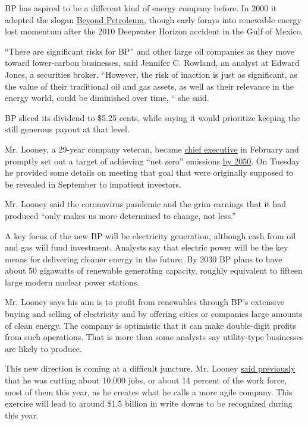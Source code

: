 BP has aspired to be a different kind of energy company before. In 2000
it adopted the slogan
\href{https://www.nytimes.com/2002/12/08/magazine/how-green-is-bp.html}{Beyond
Petroleum}, though early forays into renewable energy lost momentum
after the 2010 Deepwater Horizon accident in the Gulf of Mexico.

``There are significant risks for BP'' and other large oil companies as
they move toward lower-carbon businesses, said Jennifer C. Rowland, an
analyst at Edward Jones, a securities broker. ``However, the risk of
inaction is just as significant, as the value of their traditional oil
and gas assets, as well as their relevance in the energy world, could be
diminished over time, `` she said.

BP sliced its dividend to \$5.25 cents, while saying it would prioritize
keeping the still generous payout at that level.

Mr. Looney, a 29-year company veteran, became
\href{https://www.nytimes.com/2019/10/04/business/bp-ceo-bob-dudley-bernard-looney.html}{chief
executive} in February and promptly set out a target of achieving ``net
zero'' emissions
\href{https://www.nytimes.com/2020/02/12/climate/bp-greenhouse-gas-emissions.html}{by
2050}. On Tuesday he provided some details on meeting that goal that
were originally supposed to be revealed in September to impatient
investors.

Mr. Looney said the coronavirus pandemic and the grim earnings that it
had produced ``only makes us more determined to change, not less.''

A key focus of the new BP will be electricity generation, although cash
from oil and gas will fund investment. Analysts say that electric power
will be the key means for delivering cleaner energy in the future. By
2030 BP plans to have about 50 gigawatts of renewable generating
capacity, roughly equivalent to fifteen large modern nuclear power
stations.

Mr. Looney says his aim is to profit from renewables through BP's
extensive buying and selling of electricity and by offering cities or
companies large amounts of clean energy. The company is optimistic that
it can make double-digit profits from such operations. That is more than
some analysts say utility-type businesses are likely to produce.

This new direction is coming at a difficult juncture. Mr. Looney
\href{https://www.bbc.com/news/explainers-52966609}{said previously}
that he was cutting about 10,000 jobs, or about 14 percent of the work
force, most of them this year, as he creates what he calls a more agile
company. This exercise will lead to around \$1.5 billion in write downs
to be recognized during this year.


